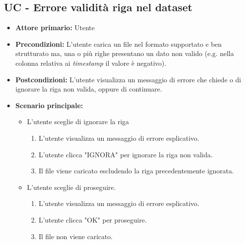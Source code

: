 \subsection{UC - Errore validità riga nel dataset}
\label{sec:UC - Errore validita riga}
\begin{itemize}
    \item \textbf{Attore primario:} Utente
    \item \textbf{Precondizioni:} L'utente carica un file nel formato supportato e ben strutturato ma, una o più righe presentano
                                  un dato non valido (e.g. nella colonna relativa ai \textit{timestamp} il valore è negativo).  
    \item \textbf{Postcondizioni:} L'utente visualizza un messaggio di errore che chiede o di ignorare la riga non valida, 
                                   oppure di continuare.
    \item \textbf{Scenario principale:}
    \begin{itemize}
        \item   L'utente sceglie di ignorare la riga
                \begin{enumerate}
                    \item L'utente visualizza un messaggio di errore esplicativo.
                    \item L'utente clicca "IGNORA" per ignorare la riga non valida.
                    \item Il file viene caricato escludendo la riga precedentemente ignorata.
                \end{enumerate} 
        \item   L'utente sceglie di proseguire.
                \begin{enumerate}
                    \item L'utente visualizza un messaggio di errore esplicativo.
                    \item L'utente clicca "OK" per proseguire.
                    \item Il file non viene caricato.
                \end{enumerate} 
    \end{itemize}
\end{itemize}

